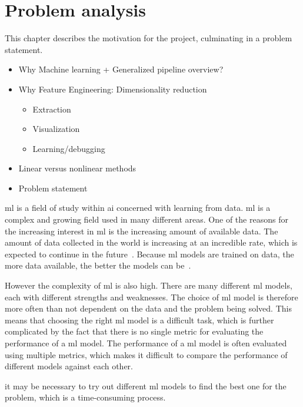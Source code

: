 \chapter{Problem analysis}\label{cha:problem-analysis}
This chapter describes the motivation for the project, culminating in a problem statement.

\begin{itemize}
    \item Why Machine learning + Generalized pipeline overview?
    \item Why Feature Engineering: Dimensionality reduction
          \begin{itemize}
              \item Extraction
              \item Visualization
              \item Learning/debugging
          \end{itemize}
    \item Linear versus nonlinear methods
    \item Problem statement
\end{itemize}

\gls{ml} is a field of study within \gls{ai} concerned with learning from data. \gls{ml} is a complex and growing field used in many different areas. One of the reasons for the increasing interest in \gls{ml} is the increasing amount of available data. The amount of data collected in the world is increasing at an incredible rate, which is expected to continue in the future~\cite{data-never-sleeps}. Because \gls{ml} models are trained on data, the more data available, the better the models can be~\cite{Unreasonable-effectiveness-of-data-Norvig}.

However the complexity of \gls{ml} is also high. There are many different \gls{ml} models, each with different strengths and weaknesses. The choice of \gls{ml} model is therefore more often than not dependent on the data and the problem being solved. This means that choosing the right \gls{ml} model is a difficult task, which is further complicated by the fact that there is no single metric for evaluating the performance of a \gls{ml} model. The performance of a \gls{ml} model is often evaluated using multiple metrics, which makes it difficult to compare the performance of different models against each other.

it may be necessary to try out different \gls{ml} models to find the best one for the problem, which is a time-consuming process.





